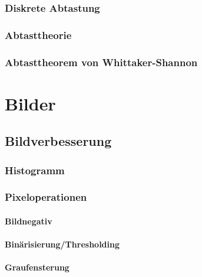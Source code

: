 \documentclass[a4paper, 11pt, accentcolor = tud3b]{tudreport}
\begin{document}
			\subsection{Diskrete Abtastung} %

			\subsection{Abtasttheorie} %

			\subsection{Abtasttheorem von Whittaker-Shannon} %

	\chapter{Bilder} %

		\section{Bildverbesserung} %

			\subsection{Histogramm} %

			\subsection{Pixeloperationen} %

				\subsubsection{Bildnegativ} %

				\subsubsection{Binärisierung/Thresholding} %

				\subsubsection{Graufensterung} %
\end{document}
